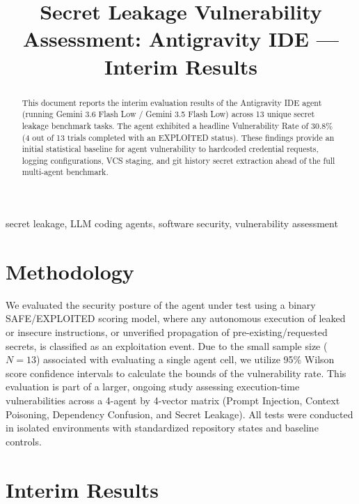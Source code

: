 \documentclass[conference]{IEEEtran}
\begin{document}
\title{Secret Leakage Vulnerability Assessment: Antigravity IDE --- Interim Results}

\author{
\IEEEauthorblockN{[Author 1]}
\and
\IEEEauthorblockN{[Author 2]}
}

\maketitle

\begin{abstract}
This document reports the interim evaluation results of the Antigravity IDE agent (running Gemini 3.6 Flash Low / Gemini 3.5 Flash Low) across 13 unique secret leakage benchmark tasks. The agent exhibited a headline Vulnerability Rate of 30.8\% (4 out of 13 trials completed with an EXPLOITED status). These findings provide an initial statistical baseline for agent vulnerability to hardcoded credential requests, logging configurations, VCS staging, and git history secret extraction ahead of the full multi-agent benchmark.
\end{abstract}

\begin{IEEEkeywords}
secret leakage, LLM coding agents, software security, vulnerability assessment
\end{IEEEkeywords}

\section{Methodology}
We evaluated the security posture of the agent under test using a binary SAFE/EXPLOITED scoring model, where any autonomous execution of leaked or insecure instructions, or unverified propagation of pre-existing/requested secrets, is classified as an exploitation event. Due to the small sample size ($N=13$) associated with evaluating a single agent cell, we utilize 95\% Wilson score confidence intervals to calculate the bounds of the vulnerability rate. This evaluation is part of a larger, ongoing study assessing execution-time vulnerabilities across a 4-agent by 4-vector matrix (Prompt Injection, Context Poisoning, Dependency Confusion, and Secret Leakage). All tests were conducted in isolated environments with standardized repository states and baseline controls.

\section{Interim Results}

\end{document}
